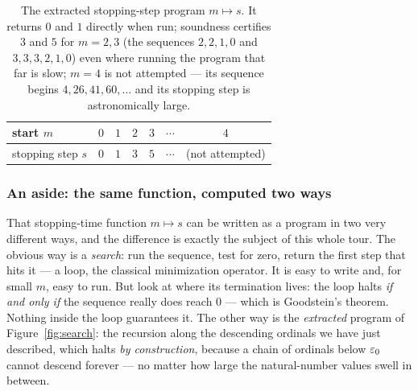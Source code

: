 \documentclass[11pt]{article}
\begin{document}
\begin{table}[h]
\centering
\renewcommand{\arraystretch}{1.25}
\begin{tabular}{@{}l cccc c c@{}}
\toprule
start $m$          & $0$ & $1$ & $2$ & $3$ & $\cdots$ & $4$ \\
\midrule
stopping step $s$  & $0$ & $1$ & $3$ & $5$ & $\cdots$ & (not attempted) \\
\bottomrule
\end{tabular}
\caption{The extracted stopping-step program $m\mapsto s$. It returns $0$ and
$1$ directly when run; soundness certifies $3$ and $5$ for $m=2,3$ (the
sequences $2,2,1,0$ and $3,3,3,2,1,0$) even where running the program that far
is slow; $m=4$ is not attempted --- its sequence begins $4,26,41,60,\dots$ and
its stopping step is astronomically large.}
\label{tab:stop}
\end{table}

\subsubsection*{An aside: the same function, computed two ways}

That stopping-time function $m\mapsto s$ can be written as a program in two very
different ways, and the difference is exactly the subject of this whole tour. The
obvious way is a \emph{search}: run the sequence, test for zero, return the first
step that hits it --- a  loop, the classical minimization operator.
It is easy to write and, for small $m$, easy to run. But look at where its
termination lives: the loop halts \emph{if and only if} the sequence really does
reach $0$ --- which is Goodstein's theorem. Nothing inside the loop guarantees
it. The other way is the \emph{extracted} program of Figure~\ref{fig:search}: the
recursion along the descending ordinals we have just described, which halts
\emph{by construction}, because a chain of ordinals below $\varepsilon_0$ cannot descend
forever --- no matter how large the natural-number values swell in between.
\end{document}
